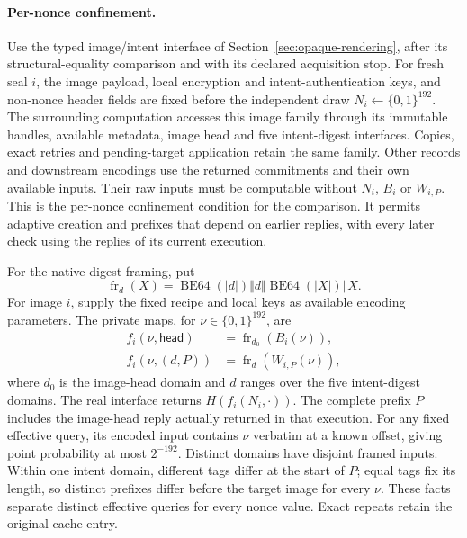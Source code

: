 \documentclass[pdflatex]{sn-jnl}
\theoremstyle{thmstyleone}
\theoremstyle{thmstylethree}
\theoremstyle{thmstyletwo}
\begin{document}
\paragraph{Per-nonce confinement.}
Use the typed image/intent interface of
Section~\ref{sec:opaque-rendering}, after its structural-equality comparison
and with its declared acquisition stop. For fresh seal $i$, the image
payload, local encryption and intent-authentication keys, and non-nonce
header fields are fixed before the independent draw
$N_i\gets\{0,1\}^{192}$. The surrounding computation accesses this image
family through its immutable handles, available metadata, image head and
five intent-digest interfaces. Copies, exact retries and pending-target
application retain the same family. Other records and downstream encodings
use the returned commitments and their own available inputs. Their raw
inputs must be computable without $N_i$, $B_i$ or $W_{i,P}$. This is the
per-nonce confinement condition for the comparison. It permits adaptive
creation and prefixes that depend on earlier replies, with every later
check using the replies of its current execution.

For the native digest framing, put
\[
 \operatorname{fr}_d(X)=
 \operatorname{BE64}(|d|)\Vert d\Vert
 \operatorname{BE64}(|X|)\Vert X.
\]
For image $i$, supply the fixed recipe and local keys as available encoding
parameters. The private maps, for $\nu\in\{0,1\}^{192}$, are
\[
 \begin{split}
  f_i(\nu,\mathsf{head})&=\operatorname{fr}_{d_0}(B_i(\nu)),\\
  f_i(\nu,(d,P))&=\operatorname{fr}_{d}(W_{i,P}(\nu)),
 \end{split}
\]
where $d_0$ is the image-head domain and $d$ ranges over the five
intent-digest domains. The real interface returns
$H(f_i(N_i,\cdot))$. The complete prefix $P$ includes the image-head
reply actually returned in that execution. For any fixed effective query,
its encoded input contains $\nu$ verbatim at a known offset, giving point
probability at most $2^{-192}$. Distinct domains have disjoint framed
inputs. Within one intent domain, different tags differ at the start of
$P$; equal tags fix its length, so distinct prefixes differ before the
target image for every $\nu$. These facts separate distinct effective
queries for every nonce value. Exact repeats retain the original cache entry.
\end{document}
